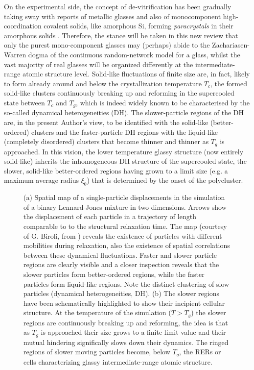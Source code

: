 \documentclass[10pt]{article}
\begin{document}
On the experimental side, the concept of de-vitrification has been gradually taking 
sway with reports of metallic glasses \cite{Hwa2012} and also of monocomponent 
high-coordination covalent solids, like amorphous Si, forming {\em paracrystals} 
in their amorphous solids \cite{Tre2012}. Therefore, the stance will be taken in this 
new review that only the purest mono-component glasses may (perhaps) abide to 
the Zachariasen-Warren dogma of the continuous random-network model for a 
glass, whilst the vast majority of real glasses \cite{Phi1983} will be organized 
differently at the intermediate-range atomic structure level. Solid-like fluctuations 
of finite size are, in fact, likely to form already around and below the crystallization 
temperature $T_c$, the formed solid-like clusters continuously breaking up and 
reforming in the supercooled state between $T_c$ and $T_g$, which is indeed 
widely known to be characterised by the so-called dynamical heterogeneities (DH). 
The slower-particle regions of the DH are, in the present Author's view, to be 
identified with the solid-like (better-ordered) clusters and the faster-particle DH 
regions with the liquid-like (completely disordered) clusters that become thinner 
and thinner as $T_g$ is approached. In this vision, the lower temperature glassy
structure (now entirely solid-like) inherits the inhomogeneous DH structure of the 
supercooled state, the slower, solid-like better-ordered regions having grown to a 
limit size (e.g. a maximum average radius $\xi_0$) that is determined by the onset 
of the polycluster.
\begin{figure}[h]
\centering
\vskip -1mm
\caption[2]{ (a) Spatial map of a single-particle displacements
in the simulation of a binary Lennard-Jones mixture in two dimensions. Arrows
show the displacement of each particle in a trajectory of length comparable to 
to the structural relaxation time. The map (courtesy of G. Biroli, from 
\cite{Ber2011}) reveals the existence of particles with different mobilities during
relaxation, also the existence of spatial correlations between these dynamical 
fluctuations. Faster and slower particle regions are clearly visible and a closer
inspection reveals that the slower particles form better-ordered regions, while
the faster particles form liquid-like regions. Note
the distinct clustering of slow particles (dynamical heterogeneities, DH). 
(b) The slower regions have been schematically highlighted to show their 
incipient cellular structure. At the temperature of the simulation ($T>T_g$)
the slower regions are continuously breaking up and reforming, the idea is that
as $T_g$ is approached their size grows to a finite limit value and their mutual 
hindering significally slows down their dynamics. The ringed regions of slower
moving particles become, below $T_g$, the RERs or cells characterizing glassy
intermediate-range atomic structure. }
\label{Fig1}
\end{figure} 
\end{document}
